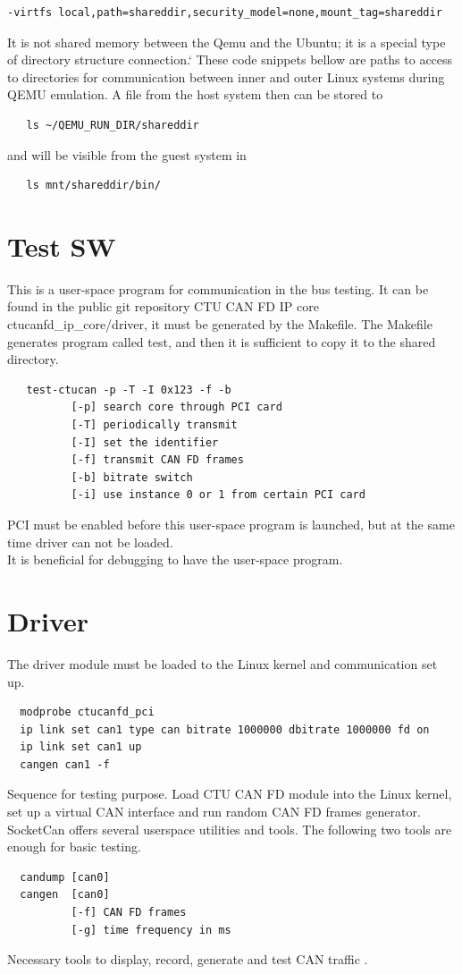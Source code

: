 \documentclass{ctuthesis}
\begin{document}
 \begin{verbatim}-virtfs local,path=shareddir,security_model=none,mount_tag=shareddir\end{verbatim}
 It is not shared memory between the Qemu and the Ubuntu; it is a special type of directory structure connection.` These code snippets bellow are paths to access to directories for communication between inner and outer Linux systems during QEMU emulation. A file from the host system then can be stored to
  \begin{verbatim}   ls ~/QEMU_RUN_DIR/shareddir\end{verbatim}
  and will be visible from the guest system in
 \begin{verbatim}   ls mnt/shareddir/bin/\end{verbatim}
 \section{Test SW}
 This is a user-space program for communication in the bus testing. It can be found in the public git repository CTU CAN FD IP core  \cite{driver-repo} ctucanfd\_ip\_core/driver, it must be generated by the Makefile. The Makefile generates program called test, and then it is sufficient to copy it to the shared directory.
 \begin{verbatim}   test-ctucan -p -T -I 0x123 -f -b
          [-p] search core through PCI card
          [-T] periodically transmit
          [-I] set the identifier
          [-f] transmit CAN FD frames
          [-b] bitrate switch
          [-i] use instance 0 or 1 from certain PCI card\end{verbatim}
 PCI must be enabled before this user-space program is launched, but at the same time driver can not be loaded. \\
 It is beneficial for debugging to have the user-space program.
 
 \section{Driver}
 The driver module must be loaded to the Linux kernel and communication set up.
 \begin{verbatim}  modprobe ctucanfd_pci
  ip link set can1 type can bitrate 1000000 dbitrate 1000000 fd on
  ip link set can1 up
  cangen can1 -f\end{verbatim}
 Sequence for testing purpose. Load CTU CAN FD module into the Linux kernel, set up a virtual CAN interface and run random CAN FD frames generator.\\
 SocketCan offers several userspace utilities and tools. The following two tools are enough for basic testing.
 \begin{verbatim}  candump [can0]
  cangen  [can0]
          [-f] CAN FD frames
          [-g] time frequency in ms\end{verbatim}
 Necessary tools to display, record, generate and test CAN traffic \cite{can-utils}.
\end{document}
